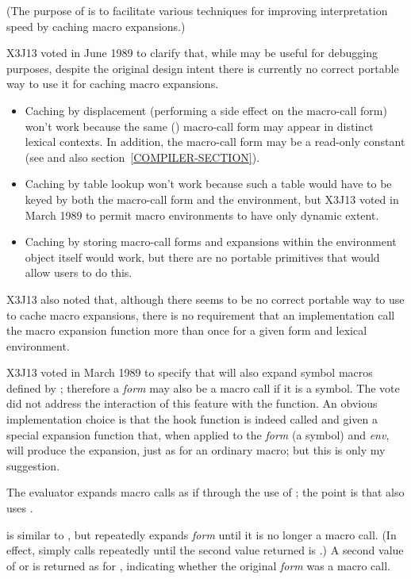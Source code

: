 \begin{defun}[Function]
\begin{obsolete}
(The purpose of
 is to facilitate various techniques
for improving interpretation speed by caching macro expansions.)
\end{obsolete}

\begin{newer}
X3J13 voted in June 1989  to clarify that, while
 may be useful for debugging purposes, despite
the original design intent there is
currently no correct portable way to use it for caching macro expansions.
\begin{itemize}
\item
 Caching by displacement (performing a side effect on the
 macro-call form) won't work because the same () macro-call
 form may appear in distinct lexical contexts.  In addition, the macro-call
 form may be a read-only constant (see  and also
 section~\ref{COMPILER-SECTION}).
\item
 Caching by table lookup won't work because such a table would have to
 be keyed by both the macro-call form and the environment,
 but X3J13 voted in March 1989 
 to permit macro environments to have only dynamic extent.
\item
 Caching by storing macro-call forms and expansions within the
 environment object itself would work, but there are no portable
 primitives that would allow users to do this.
\end{itemize}
X3J13 also noted that, although there seems to be no correct portable way to use
 to cache macro expansions, there is no
requirement that an implementation call the macro expansion
function more than once for a given form and lexical environment.
\end{newer}

\begin{new}
X3J13 voted in March 1989
to specify that  will also expand symbol macros
defined by ; therefore a {\it form} may also be
a macro call if it is a symbol.  The vote did not address the interaction
of this feature with the  function.  An obvious
implementation choice is that the hook function is indeed called
and given a special expansion function that, when applied to the
{\it form} (a symbol) and {\it env}, will produce the expansion,
just as for an ordinary macro; but this is only my suggestion.
\end{new}

The evaluator expands macro calls as if through the use of ;
the point is that  also uses .

 is similar to ,
but repeatedly expands {\it form} until it is no longer a macro call.
(In effect,  simply calls  repeatedly
until the second value returned is {\nil}.)
A second value of  or {\nil} is returned as for ,
indicating whether the original {\it form} was a macro call.
\end{defun}

